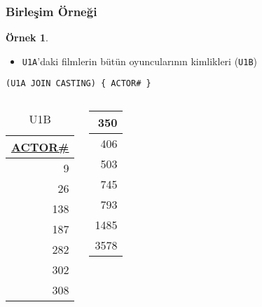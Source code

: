 \documentclass[dvipsnames]{beamer}
\theoremstyle{definition}
\theoremstyle{example}
\newtheorem{ornek}[theorem]{Örnek}
\theoremstyle{plain}
\begin{document}
\begin{frame}[fragile]
  \frametitle{Birleşim Örneği}

  \begin{ornek}
    \begin{itemize}
      \item \texttt{U1A}'daki filmlerin bütün oyuncularının kimlikleri (\texttt{U1B})
    \end{itemize}

    \begin{lstlisting}
(U1A JOIN CASTING) { ACTOR# }
    \end{lstlisting}

    \pause
    \vspace{-10pt}
    \begin{columns}[b]
      \begin{tiny}
      \begin{table}
        \caption{U1B}
        \begin{tabular}{|r|}\hline
\underline{ACTOR\#}\\[2pt]\hline\hline
                  9\\\hline
                 26\\\hline
                138\\\hline
                187\\\hline
                282\\\hline
                302\\\hline
                308\\\hline
        \end{tabular}
      \end{table}
      \end{tiny}

      \begin{tiny}
      \begin{table}
        \begin{tabular}{|r|}\hline
                350\\\hline
                406\\\hline
                503\\\hline
                745\\\hline
                793\\\hline
               1485\\\hline
               3578\\\hline
        \end{tabular}
      \end{table}
      \end{tiny}
    \end{columns}
  \end{ornek}
\end{frame}
\end{document}
